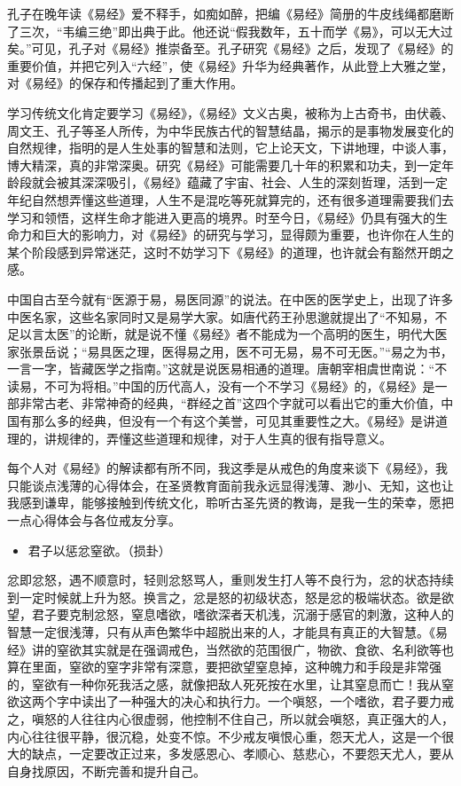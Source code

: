孔子在晚年读《易经》爱不释手，如痴如醉，把编《易经》简册的牛皮线绳都磨断了三次，“韦编三绝”即出典于此。他还说“假我数年，五十而学《易》，可以无大过矣。”可见，孔子对《易经》推崇备至。孔子研究《易经》之后，发现了《易经》的重要价值，并把它列入“六经”，使《易经》升华为经典著作，从此登上大雅之堂，对《易经》的保存和传播起到了重大作用。

学习传统文化肯定要学习《易经》，《易经》文义古奥，被称为上古奇书，由伏羲、周文王、孔子等圣人所传，为中华民族古代的智慧结晶，揭示的是事物发展变化的自然规律，指明的是人生处事的智慧和法则，它上论天文，下讲地理，中谈人事，博大精深，真的非常深奥。研究《易经》可能需要几十年的积累和功夫，到一定年龄段就会被其深深吸引，《易经》蕴藏了宇宙、社会、人生的深刻哲理，活到一定年纪自然想弄懂这些道理，人生不是混吃等死就算完的，还有很多道理需要我们去学习和领悟，这样生命才能进入更高的境界。时至今日，《易经》仍具有强大的生命力和巨大的影响力，对《易经》的研究与学习，显得颇为重要，也许你在人生的某个阶段感到异常迷茫，这时不妨学习下《易经》的道理，也许就会有豁然开朗之感。

中国自古至今就有“医源于易，易医同源”的说法。在中医的医学史上，出现了许多中医名家，这些名家同时又是易学大家。如唐代药王孙思邈就提出了“不知易，不足以言太医”的论断，就是说不懂《易经》者不能成为一个高明的医生，明代大医家张景岳说；“易具医之理，医得易之用，医不可无易，易不可无医。”“易之为书，一言一字，皆藏医学之指南。”这就是说医易相通的道理。唐朝宰相虞世南说：“不读易，不可为将相。”中国的历代高人，没有一个不学习《易经》的，《易经》是一部非常古老、非常神奇的经典，“群经之首”这四个字就可以看出它的重大价值，中国有那么多的经典，但没有一个有这个美誉，可见其重要性之大。《易经》是讲道理的，讲规律的，弄懂这些道理和规律，对于人生真的很有指导意义。

每个人对《易经》的解读都有所不同，我这季是从戒色的角度来谈下《易经》，我只能谈点浅薄的心得体会，在圣贤教育面前我永远显得浅薄、渺小、无知，这也让我感到谦卑，能够接触到传统文化，聆听古圣先贤的教诲，是我一生的荣幸，愿把一点心得体会与各位戒友分享。

\begin{itemize}\it
    \item 君子以惩忿窒欲。（损卦）
\end{itemize}

忿即忿怒，遇不顺意时，轻则忿怒骂人，重则发生打人等不良行为，忿的状态持续到一定时候就上升为怒。换言之，忿是怒的初级状态，怒是忿的极端状态。欲是欲望，君子要克制忿怒，窒息嗜欲，嗜欲深者天机浅，沉溺于感官的刺激，这种人的智慧一定很浅薄，只有从声色繁华中超脱出来的人，才能具有真正的大智慧。《易经》讲的窒欲其实就是在强调戒色，当然欲的范围很广，物欲、食欲、名利欲等也算在里面，窒欲的窒字非常有深意，要把欲望窒息掉，这种魄力和手段是非常强的，窒欲有一种你死我活之感，就像把敌人死死按在水里，让其窒息而亡！我从窒欲这两个字中读出了一种强大的决心和执行力。一个嗔怒，一个嗜欲，君子要力戒之，嗔怒的人往往内心很虚弱，他控制不住自己，所以就会嗔怒，真正强大的人，内心往往很平静，很沉稳，处变不惊。不少戒友嗔恨心重，怨天尤人，这是一个很大的缺点，一定要改正过来，多发感恩心、孝顺心、慈悲心，不要怨天尤人，要从自身找原因，不断完善和提升自己。

